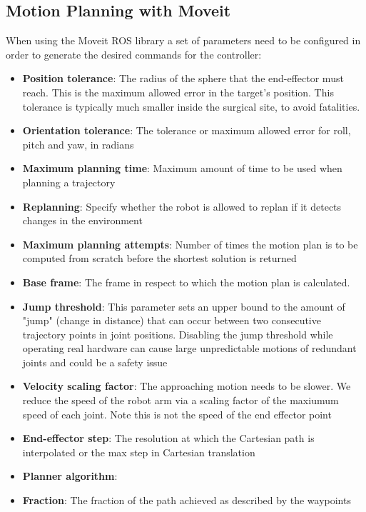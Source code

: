 \subsection{Motion Planning with Moveit}

When using the Moveit ROS library a set of parameters need to be configured in order to generate the desired commands for the controller:
\begin{itemize}
	\item \textbf{Position tolerance}: The radius of the sphere that the end-effector must reach. This is the maximum allowed error in the target's position.
	This tolerance is typically much smaller inside the surgical site, to avoid fatalities.
	\item \textbf{Orientation tolerance}: The tolerance or maximum allowed error for roll, pitch and yaw, in radians
	\item \textbf{Maximum planning time}: Maximum amount of time to be used when planning a trajectory
	\item \textbf{Replanning}: Specify whether the robot is allowed to replan if it detects changes in the environment
	\item \textbf{Maximum planning attempts}: Number of times the motion plan is to be computed from scratch before the shortest solution is returned
	\item \textbf{Base frame}: The frame in respect to which the motion plan is calculated.
	\item \textbf{Jump threshold}: This parameter sets an upper bound to the amount of "jump" (change in distance) that can occur between two consecutive trajectory points in joint 
	positions. Disabling the jump threshold while operating real hardware can cause large unpredictable motions of redundant joints 
	and could be a safety issue
	\item \textbf{Velocity scaling factor}: The approaching motion needs to be slower. We reduce the speed of the robot arm via a scaling factor of the 
	maxiumum speed of each joint. Note this is not the speed of the end effector point
	\item \textbf{End-effector step}: The resolution at which the Cartesian path is interpolated or the max step in Cartesian translation
	\item \textbf{Planner algorithm}:
	\item \textbf{Fraction}: The fraction of the path achieved as described by the waypoints
\end{itemize}

